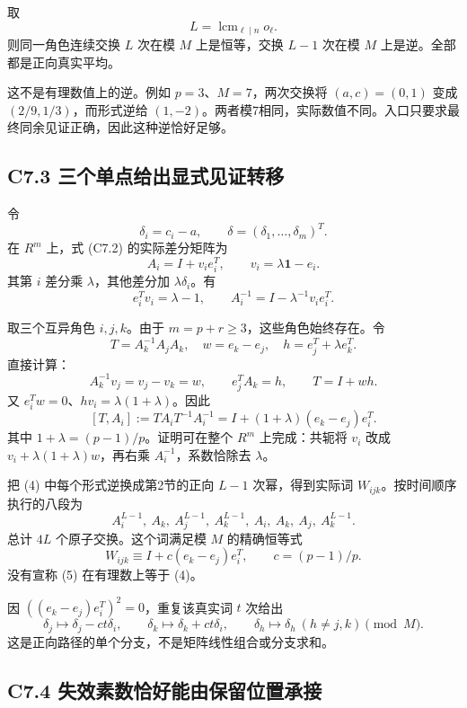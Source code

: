 {取} \[
L=\operatorname{lcm}_{\ell\mid n}o_\ell.
\] {则同一角色连续交换} \(L\) {次在模} \(M\) {上是恒等，交换} \(L-1\) {次在模} \(M\) {上是逆。全部都是正向真实平均。}

{这不是有理数值上的逆。例如} \(p=3\){、}\(M=7\){，两次交换将} \((a,c)=(0,1)\) {变成} \((2/9,1/3)\){，而形式逆给} \((1,-2)\){。两者模7相同，实际数值不同。入口只要求最终同余见证正确，因此这种逆恰好足够。}

\subsection*{\texorpdfstring{{C7.3} {三个单点给出显式见证转移}}{C7.3 三个单点给出显式见证转移}}\label{C7-h41}

{令} \[
\delta_i=c_i-a,\qquad \delta=(\delta_1,\ldots,\delta_m)^T.
\] {在} \(R^m\) {上，式} {(C7.2)} {的实际差分矩阵为} \[
A_i=I+v_i e_i^T,\qquad v_i=\lambda\mathbf1-e_i.
\tag{C7.3}
\] {其第} \(i\) {差分乘} \(\lambda\){，其他差分加} \(\lambda\delta_i\){。有} \[
e_i^Tv_i=\lambda-1,\qquad
A_i^{-1}=I-\lambda^{-1}v_ie_i^T.
\]

{取三个互异角色} \(i,j,k\){。由于} \(m=p+r\ge3\){，这些角色始终存在。令} \[
T=A_k^{-1}A_jA_k,\quad w=e_k-e_j,\quad h=e_j^T+\lambda e_k^T.
\] {直接计算：} \[
A_k^{-1}v_j=v_j-v_k=w,\qquad e_j^TA_k=h,\qquad T=I+wh.
\] {又} \(e_i^Tw=0\){、}\(hv_i=\lambda(1+\lambda)\){。因此} \[
\boxed{[T,A_i]:=TA_iT^{-1}A_i^{-1}
=I+(1+\lambda)(e_k-e_j)e_i^T.}\tag{C7.4}
\] {其中} \(1+\lambda=(p-1)/p\){。证明可在整个} \(R^m\) {上完成：共轭将} \(v_i\) {改成} \(v_i+\lambda(1+\lambda)w\){，再右乘} \(A_i^{-1}\){，系数恰除去} \(\lambda\){。}

{把} {(4)} {中每个形式逆换成第2节的正向} \(L-1\) {次幂，得到实际词} \(W_{ijk}\){。按时间顺序执行的八段为} \[
A_i^{L-1},\ A_k,\ A_j^{L-1},\ A_k^{L-1},
\ A_i,\ A_k,\ A_j,\ A_k^{L-1}.\tag{C7.5}
\] {总计} \(4L\) {个原子交换。这个词满足模} \(M\) {的精确恒等式} \[
W_{ijk}\equiv I+c(e_k-e_j)e_i^T,\qquad c=(p-1)/p.
\tag{C7.6}
\] {没有宣称} {(5)} {在有理数上等于} {(4)。}

{因} \(((e_k-e_j)e_i^T)^2=0\){，重复该真实词} \(t\) {次给出} \[
\delta_j\mapsto\delta_j-ct\delta_i,\qquad
\delta_k\mapsto\delta_k+ct\delta_i,\qquad
\delta_h\mapsto\delta_h\ (h\ne j,k)
\pmod M.\tag{C7.7}
\] {这是正向路径的单个分支，不是矩阵线性组合或分支求和。}

\subsection*{\texorpdfstring{{C7.4} {失效素数恰好能由保留位置承接}}{C7.4 失效素数恰好能由保留位置承接}}\label{C7-h42}

